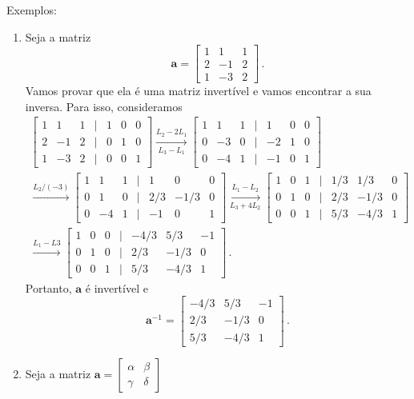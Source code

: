 \documentclass[12pt,a4paper]{report}
\newcommand{\mb}{\mathbf}
\begin{document}
Exemplos:
\begin{enumerate}
  \item Seja a matriz
 $$\mb a=\begin{bmatrix}
   1&1&1\\
   2&-1&2\\
   1&-3&2
 \end{bmatrix}\,.$$
 Vamos provar que ela é uma matriz invertível e vamos encontrar a sua inversa. Para isso, consideramos
 \begin{multline*}
   \begin{bmatrix}
     1&1&1&|&1&0&0\\
     2&-1&2&|&0&1&0\\
     1&-3&2&|&0&0&1
   \end{bmatrix}\xrightarrow[L_3-L_1]{L_2-2L_1}\begin{bmatrix}
     1&1&1&|&1&0&0\\
     0&-3&0&|&-2&1&0\\
     0&-4&1&|&-1&0&1
   \end{bmatrix}\\
   \xrightarrow{L_2/(-3)}\begin{bmatrix}
     1&1&1&|&1&0&0\\
     0&1&0&|&2/3&-1/3&0\\
     0&-4&1&|&-1&0&1
   \end{bmatrix}\xrightarrow[L_3+4L_2]{L_1-L_2}\begin{bmatrix}
     1&0&1&|&1/3&1/3&0\\
     0&1&0&|&2/3&-1/3&0\\
     0&0&1&|&5/3&-4/3&1
   \end{bmatrix}\\
   \xrightarrow{L_1-L3}\begin{bmatrix}
     1&0&0&|&-4/3&5/3&-1\\
     0&1&0&|&2/3&-1/3&0\\
     0&0&1&|&5/3&-4/3&1
   \end{bmatrix}\,.
 \end{multline*}
 Portanto, $\mb a$ é invertível e
 $$\mb a^{-1}=\begin{bmatrix}
   -4/3&5/3&-1\\
   2/3&-1/3&0\\
   5/3&-4/3&1
 \end{bmatrix}\,.$$
 \item Seja a matriz
 $\mb a=\begin{bmatrix}
   \alpha&\beta\\
   \gamma&\delta
 \end{bmatrix}$

\end{enumerate}
\end{document}
